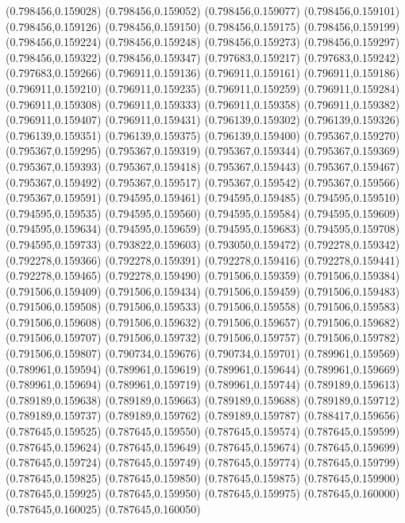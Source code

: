 (0.798456,0.159028)
(0.798456,0.159052)
(0.798456,0.159077)
(0.798456,0.159101)
(0.798456,0.159126)
(0.798456,0.159150)
(0.798456,0.159175)
(0.798456,0.159199)
(0.798456,0.159224)
(0.798456,0.159248)
(0.798456,0.159273)
(0.798456,0.159297)
(0.798456,0.159322)
(0.798456,0.159347)
(0.797683,0.159217)
(0.797683,0.159242)
(0.797683,0.159266)
(0.796911,0.159136)
(0.796911,0.159161)
(0.796911,0.159186)
(0.796911,0.159210)
(0.796911,0.159235)
(0.796911,0.159259)
(0.796911,0.159284)
(0.796911,0.159308)
(0.796911,0.159333)
(0.796911,0.159358)
(0.796911,0.159382)
(0.796911,0.159407)
(0.796911,0.159431)
(0.796139,0.159302)
(0.796139,0.159326)
(0.796139,0.159351)
(0.796139,0.159375)
(0.796139,0.159400)
(0.795367,0.159270)
(0.795367,0.159295)
(0.795367,0.159319)
(0.795367,0.159344)
(0.795367,0.159369)
(0.795367,0.159393)
(0.795367,0.159418)
(0.795367,0.159443)
(0.795367,0.159467)
(0.795367,0.159492)
(0.795367,0.159517)
(0.795367,0.159542)
(0.795367,0.159566)
(0.795367,0.159591)
(0.794595,0.159461)
(0.794595,0.159485)
(0.794595,0.159510)
(0.794595,0.159535)
(0.794595,0.159560)
(0.794595,0.159584)
(0.794595,0.159609)
(0.794595,0.159634)
(0.794595,0.159659)
(0.794595,0.159683)
(0.794595,0.159708)
(0.794595,0.159733)
(0.793822,0.159603)
(0.793050,0.159472)
(0.792278,0.159342)
(0.792278,0.159366)
(0.792278,0.159391)
(0.792278,0.159416)
(0.792278,0.159441)
(0.792278,0.159465)
(0.792278,0.159490)
(0.791506,0.159359)
(0.791506,0.159384)
(0.791506,0.159409)
(0.791506,0.159434)
(0.791506,0.159459)
(0.791506,0.159483)
(0.791506,0.159508)
(0.791506,0.159533)
(0.791506,0.159558)
(0.791506,0.159583)
(0.791506,0.159608)
(0.791506,0.159632)
(0.791506,0.159657)
(0.791506,0.159682)
(0.791506,0.159707)
(0.791506,0.159732)
(0.791506,0.159757)
(0.791506,0.159782)
(0.791506,0.159807)
(0.790734,0.159676)
(0.790734,0.159701)
(0.789961,0.159569)
(0.789961,0.159594)
(0.789961,0.159619)
(0.789961,0.159644)
(0.789961,0.159669)
(0.789961,0.159694)
(0.789961,0.159719)
(0.789961,0.159744)
(0.789189,0.159613)
(0.789189,0.159638)
(0.789189,0.159663)
(0.789189,0.159688)
(0.789189,0.159712)
(0.789189,0.159737)
(0.789189,0.159762)
(0.789189,0.159787)
(0.788417,0.159656)
(0.787645,0.159525)
(0.787645,0.159550)
(0.787645,0.159574)
(0.787645,0.159599)
(0.787645,0.159624)
(0.787645,0.159649)
(0.787645,0.159674)
(0.787645,0.159699)
(0.787645,0.159724)
(0.787645,0.159749)
(0.787645,0.159774)
(0.787645,0.159799)
(0.787645,0.159825)
(0.787645,0.159850)
(0.787645,0.159875)
(0.787645,0.159900)
(0.787645,0.159925)
(0.787645,0.159950)
(0.787645,0.159975)
(0.787645,0.160000)
(0.787645,0.160025)
(0.787645,0.160050)
